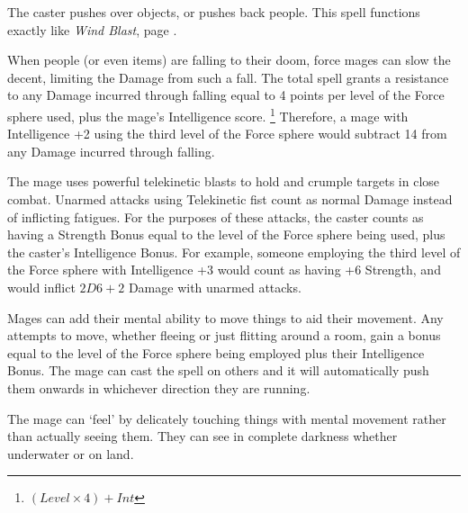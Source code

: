 \begin{multicols}{2}
\label{spellShunt}

The caster pushes over objects, or pushes back people.
This spell functions exactly like \textit{Wind Blast}, page \pageref{windblast}.


When people (or even items) are falling to their doom, force mages can slow the decent, limiting the Damage from such a fall.
The total spell grants a resistance to any Damage incurred through falling equal to 4 points per level of the Force sphere used, plus the mage's Intelligence score.%
\footnote{$(Level \times 4) + Int$}
Therefore, a mage with Intelligence +2 using the third level of the Force sphere would subtract 14 from any Damage incurred through falling.


The mage uses powerful telekinetic blasts to hold and crumple targets in close combat.
Unarmed attacks using Telekinetic fist count as normal Damage instead of inflicting \glspl{fatigue}.
For the purposes of these attacks, the caster counts as having a Strength Bonus equal to the level of the Force sphere being used, plus the caster's Intelligence Bonus.
For example, someone employing the third level of the Force sphere with Intelligence +3 would count as having +6 Strength, and would inflict $2D6+2$ Damage with unarmed attacks.

\label{spellRetreat}

Mages can add their mental ability to move things to aid their movement.
Any attempts to move, whether fleeing or just flitting around a room, gain a bonus equal to the level of the Force sphere being employed plus their Intelligence Bonus.
The mage can cast the spell on others and it will automatically push them onwards in whichever direction they are running.

\label{spellClairvoyance}

The mage can `feel' by delicately touching things with mental movement rather than actually seeing them. They can see in complete darkness whether underwater or on land.


\end{multicols}
